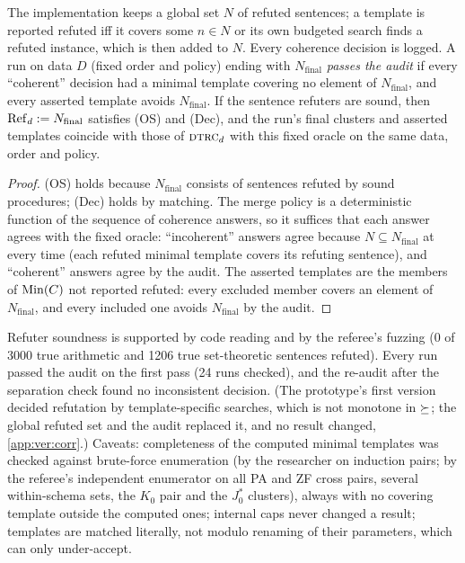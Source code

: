 \begin{proposition}\label{prop:many:audit}
The implementation keeps a global set $N$ of refuted sentences; a template is reported refuted iff it covers some
$n\in N$ or its own budgeted search finds a refuted instance, which is then added to $N$. Every coherence decision is
logged. A run on data $D$ (fixed order and policy) ending with $N_{\mathrm{final}}$ \emph{passes the audit} if every
``coherent'' decision had a minimal template covering no element of $N_{\mathrm{final}}$, and every asserted template avoids
$N_{\mathrm{final}}$. If the sentence refuters are sound, then $\mathrm{Ref}_d:=N_{\mathrm{final}}$ satisfies (OS) and (Dec), and the
run's final clusters and asserted templates coincide with those of $\textsc{dtrc}_d$ with this fixed oracle on the same data,
order and policy.
\end{proposition}
\begin{proof}
(OS) holds because $N_{\mathrm{final}}$ consists of sentences refuted by sound procedures; (Dec) holds by matching. The
merge policy is a deterministic function of the sequence of coherence answers, so it suffices that each answer agrees with
the fixed oracle: ``incoherent'' answers agree because $N\subseteq N_{\mathrm{final}}$ at every time (each refuted minimal
template covers its refuting sentence), and ``coherent'' answers agree by the audit. The asserted templates are the members
of $\mathrm{Min}(C)$ not reported refuted: every excluded member covers an element of $N_{\mathrm{final}}$, and every included one
avoids $N_{\mathrm{final}}$ by the audit.
\end{proof}
Refuter soundness is supported by code reading and by the referee's fuzzing (0 of 3000 true arithmetic and 1206 true
set-theoretic sentences refuted). Every \DTRC{} run passed the audit on the first pass (24 runs checked), and the re-audit
after the separation check found no inconsistent decision. (The prototype's first version decided refutation by
template-specific searches, which is not monotone in $\succeq$; the global refuted set and the audit replaced it, and no
result changed, \cref{app:ver:corr}.) Caveats: completeness of the computed minimal
templates was checked against brute-force enumeration (by the researcher on induction pairs; by the referee's independent
enumerator on all PA and ZF cross pairs, several within-schema sets, the $K_0$ pair and the $J^*_0$ clusters), always with no
covering template outside the computed ones; internal caps never changed a result; templates are matched literally, not
modulo renaming of their parameters, which can only under-accept.

